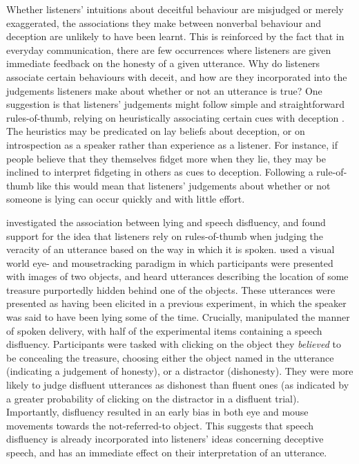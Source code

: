 \documentclass[a4paper,man,natbib]{apa6}
\begin{document}
Whether listeners' intuitions about deceitful behaviour are misjudged or merely exaggerated, the associations they make between nonverbal behaviour and deception are unlikely to have been learnt.
This is reinforced by the fact that in everyday communication, there are few occurrences where listeners are given immediate feedback on the honesty of a given utterance.
Why do listeners associate certain behaviours with deceit, and how are they incorporated into the judgements listeners make about whether or not an utterance is true?
One suggestion is that listeners' judgements might follow simple and straightforward rules-of-thumb, relying on heuristically associating certain cues with deception \citep{DePaulo1982}.
The heuristics may be predicated on lay beliefs about deception, or on introspection as a speaker rather than experience as a listener.
For instance, if people believe that they themselves fidget more when they lie, they may be inclined to interpret fidgeting in others as cues to deception.
Following a rule-of-thumb like this would mean that listeners' judgements about whether or not someone is lying can occur quickly and with little effort.

\citet{Loy2017} investigated the association between lying and speech disfluency, and found support for the idea that listeners rely on rules-of-thumb when judging the veracity of an utterance based on the way in which it is spoken.
\citeauthor{Loy2017} used a visual world eye- and mousetracking paradigm in which participants were presented with images of two objects, and heard utterances describing the location of some treasure purportedly hidden behind one of the objects.
These utterances were presented as having been elicited in a previous experiment, in which the speaker was said to have been lying some of the time.
Crucially, \citet{Loy2017} manipulated the manner of spoken delivery, with half of the experimental items containing a speech disfluency.
Participants were tasked with clicking on the object they \textit{believed} to be concealing the treasure, choosing either the object named in the utterance (indicating a judgement of honesty), or a distractor (dishonesty).
They were more likely to judge disfluent utterances as dishonest than fluent ones (as indicated by a greater probability of clicking on the distractor in a disfluent trial). 
Importantly, disfluency resulted in an early bias in both eye and mouse movements towards the not-referred-to object.
This suggests that speech disfluency is already incorporated into listeners' ideas concerning deceptive speech, and has an immediate effect on their interpretation of an utterance. 
\end{document}
